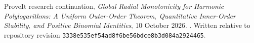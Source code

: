 ProveIt research continuation,
\emph{Global Radial Monotonicity for Harmonic Polylogarithms:
A Uniform Outer-Order Theorem, Quantitative Inner-Order Stability,
and Positive Binomial Identities},
10 October 2026.
.
Written relative to repository revision
\texttt{3338e535ef54ad8f6be56bdce8b3d084a2924465}.
